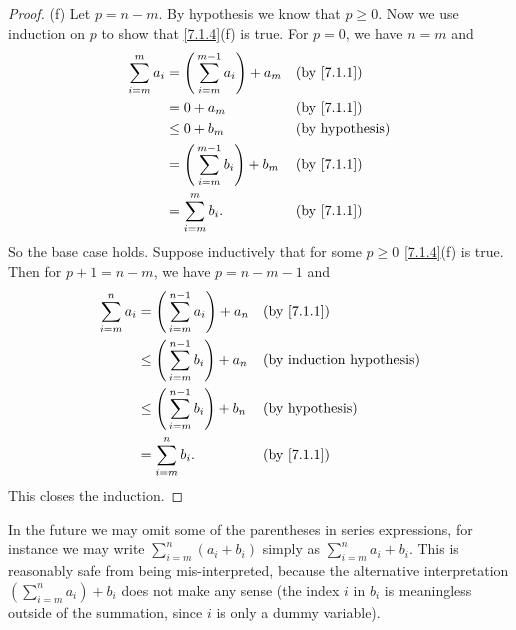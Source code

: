 \begin{proof}{(f)}
  Let \(p = n - m\).
  By hypothesis we know that \(p \geq 0\).
  Now we use induction on \(p\) to show that \cref{7.1.4}(f) is true.
  For \(p = 0\), we have \(n = m\) and
  \begin{align*}
    \sum_{i = m}^m a_i & = \Bigg(\sum_{i = m}^{m - 1} a_i\Bigg) + a_m &  & \text{(by \cref{7.1.1})} \\
                       & = 0 + a_m                                    &  & \text{(by \cref{7.1.1})} \\
                       & \leq 0 + b_m                                 &  & \text{(by hypothesis)}   \\
                       & = \Bigg(\sum_{i = m}^{m - 1} b_i\Bigg) + b_m &  & \text{(by \cref{7.1.1})} \\
                       & = \sum_{i = m}^m b_i.                        &  & \text{(by \cref{7.1.1})} \\
  \end{align*}
  So the base case holds.
  Suppose inductively that for some \(p \geq 0\) \cref{7.1.4}(f) is true.
  Then for \(p + 1 = n - m\), we have \(p = n - m - 1\) and
  \begin{align*}
    \sum_{i = m}^n a_i & = \Bigg(\sum_{i = m}^{n - 1} a_i\Bigg) + a_n    &  & \text{(by \cref{7.1.1})}         \\
                       & \leq \Bigg(\sum_{i = m}^{n - 1} b_i\Bigg) + a_n &  & \text{(by induction hypothesis)} \\
                       & \leq \Bigg(\sum_{i = m}^{n - 1} b_i\Bigg) + b_n &  & \text{(by hypothesis)}           \\
                       & = \sum_{i = m}^n b_i.                           &  & \text{(by \cref{7.1.1})}         \\
  \end{align*}
  This closes the induction.
\end{proof}

\begin{rmk}\label{7.1.5}
  In the future we may omit some of the parentheses in series expressions, for instance we may write \(\sum_{i = m}^n (a_i + b_i)\) simply as \(\sum_{i = m}^n a_i + b_i\).
  This is reasonably safe from being mis-interpreted, because the alternative interpretation \((\sum_{i = m}^n a_i) + b_i\) does not make any sense
  (the index \(i\) in \(b_i\) is meaningless outside of the summation, since \(i\) is only a dummy variable).
\end{rmk}

